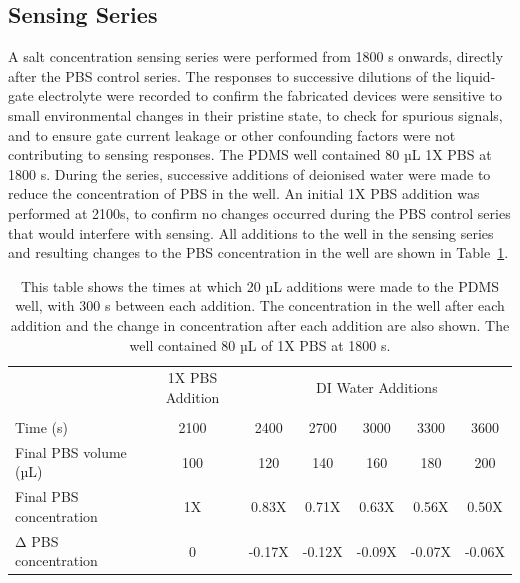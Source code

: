 \documentclass[
  a4paper,
]{scrbook}
\begin{document}
\hypertarget{sec-salt-conc-series}{%
\subsection{Sensing Series}\label{sec-salt-conc-series}}

A salt concentration sensing series were performed from 1800 s onwards,
directly after the PBS control series. The responses to successive
dilutions of the liquid-gate electrolyte were recorded to confirm the
fabricated devices were sensitive to small environmental changes in
their pristine state, to check for spurious signals, and to ensure gate
current leakage or other confounding factors were not contributing to
sensing responses. The PDMS well contained 80 µL 1X PBS at 1800 s.
During the series, successive additions of deionised water were made to
reduce the concentration of PBS in the well. An initial 1X PBS addition
was performed at 2100s, to confirm no changes occurred during the PBS
control series that would interfere with sensing. All additions to the
well in the sensing series and resulting changes to the PBS
concentration in the well are shown in Table~\ref{tbl-salt-conc-series}.

\hypertarget{tbl-salt-conc-series}{}
\begin{longtable}[t]{lcccccc}
\caption{\label{tbl-salt-conc-series}This table shows the times at which 20 µL additions were made to the
PDMS well, with 300 s between each addition. The concentration in the
well after each addition and the change in concentration after each
addition are also shown. The well contained 80 µL of 1X PBS at 1800 s. }\tabularnewline

\toprule
\multicolumn{1}{c}{ } & \multicolumn{1}{c}{1X PBS Addition} & \multicolumn{5}{c}{DI Water Additions} \\
\cmidrule(l{3pt}r{3pt}){2-2} \cmidrule(l{3pt}r{3pt}){3-7}
 &  &  &  &  &  & \\
\midrule
Time (s) & 2100 & 2400 & 2700 & 3000 & 3300 & 3600\\
Final PBS volume (µL) & 100 & 120 & 140 & 160 & 180 & 200\\
Final PBS concentration & 1X & 0.83X & 0.71X & 0.63X & 0.56X & 0.50X\\
Δ PBS concentration & 0 & -0.17X & -0.12X & -0.09X & -0.07X & -0.06X\\
\bottomrule
\end{longtable}
\end{document}
